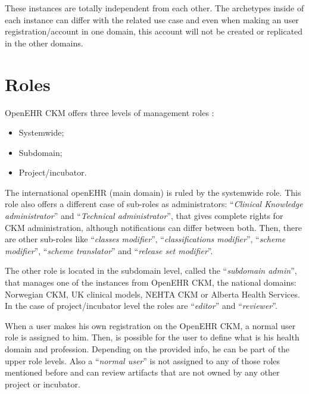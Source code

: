 \documentclass[mim_thesis.tex]{subfiles}
\begin{document}
These instances are totally independent from each other. The archetypes inside of each instance can differ with the related use case and even when making an user registration/account in one domain, this account will not be created or replicated in the other domains.

\section{Roles}
OpenEHR CKM offers three levels of management roles \citep{openEHRCKM}:
\begin{itemize}[noitemsep]
\item Systemwide; 
\item Subdomain; 
\item Project/incubator.
\end{itemize}

The international openEHR (main domain) is ruled by the systemwide role. This role also offers a different case of sub-roles as administrators: “\textit{Clinical Knowledge administrator}” and “\textit{Technical administrator}”, that gives complete rights for CKM administration, although notifications can differ between both. Then, there are other sub-roles like “\textit{classes modifier}”, “\textit{classifications modifier}”, “\textit{scheme modifier}”, “\textit{scheme translator}” and “\textit{release set modifier}”. 

The other role is located in the subdomain level, called the “\textit{subdomain admin}”, that manages one of the instances from OpenEHR CKM, the national domains: Norwegian CKM, UK clinical models, NEHTA CKM or Alberta Health Services. In the case of project/incubator level the roles are “\textit{editor}” and “\textit{reviewer}”.

When a user makes his own registration on the OpenEHR CKM, a normal user role is assigned to him. Then, is possible for the user to define what is his health domain and profession. Depending on the provided info, he can be part of the upper role levels. Also a “\textit{normal user}” is not assigned to any of those roles mentioned before and can review artifacts that are not owned by any other project or incubator. 
\end{document}
